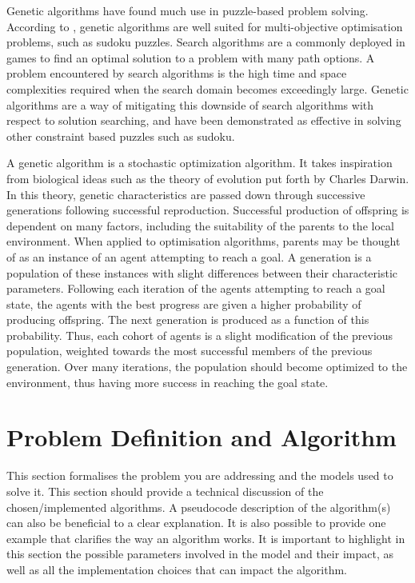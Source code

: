 \documentclass{svproc}
\begin{document}
Genetic algorithms have found much use in puzzle-based problem solving. According to \cite{geneticAlgo}, genetic algorithms are well suited for multi-objective optimisation problems, such as sudoku puzzles. Search algorithms are a commonly deployed in games to find an optimal solution to a problem with many path options. A problem encountered by search algorithms is the high time and space complexities required when the search domain becomes exceedingly large. Genetic algorithms are a way of mitigating this downside of search algorithms with respect to solution searching, and have been demonstrated as effective in solving other constraint based puzzles such as sudoku.

A genetic algorithm is a stochastic optimization algorithm. It takes inspiration from biological ideas such as the theory of evolution put forth by Charles Darwin. In this theory, genetic characteristics are passed down through successive generations following successful reproduction. Successful production of offspring is dependent on many factors, including the suitability of the parents to the local environment. When applied to optimisation algorithms, parents may be thought of as an instance of an agent attempting to reach a goal. A generation is a population of these instances with slight differences between their characteristic parameters. Following each iteration of the agents attempting to reach a goal state, the agents with the best progress are given a higher probability of producing offspring. The next generation is produced as a function of this probability. Thus, each cohort of agents is a slight modification of the previous population, weighted towards the most successful members of the previous generation. Over many iterations, the population should become optimized to the environment, thus having more success in reaching the goal state.



\section{Problem Definition and Algorithm}
This section formalises the problem you are addressing and the models used to solve it. This section should provide a technical discussion of the chosen/implemented algorithms. A pseudocode description of the algorithm(s) can also be beneficial to a clear explanation. It is also possible to provide one example that clarifies the way an algorithm works. It is important to highlight in this section the possible parameters involved in the model and their impact, as well as all the implementation choices that can impact the algorithm.
\end{document}
